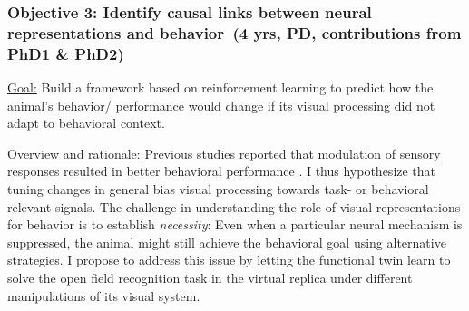 \documentclass[COG,11pt]{ercgrant}
\begin{document}


\subsubsection{Objective 3: Identify causal links between neural representations and behavior~(4 yrs, PD, contributions from PhD1 \& PhD2)\hfill{}}
\underline{Goal:} Build a framework based on reinforcement learning to predict how the animal's behavior/ performance would change if its visual processing did not adapt to behavioral context.

\underline{Overview and rationale:} 
Previous studies reported that modulation of sensory responses resulted in better behavioral performance \parencite{Spitzer1988-kq, Bennett2013-rk, Dadarlat2017-jw, De_Gee2022-ir}.
I thus hypothesize that tuning changes in general bias visual processing towards task- or behavioral relevant signals.
The challenge in understanding the role of visual representations for behavior is to establish \textit{necessity}: Even when a particular neural mechanism is suppressed, the animal might still achieve the behavioral goal using alternative strategies. 
I propose to address this issue by letting the functional twin learn to solve the open field recognition task in the virtual replica under different manipulations of its visual system.  

\end{document}
